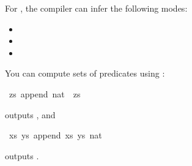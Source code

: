 \begin{isabellebody}
\begin{isamarkuptext}
  For , the compiler can infer the following modes:
  \begin{itemize}
    \item {}
    \item {}
    \item {}
  \end{itemize}
  You can compute sets of predicates using \hypertarget{command.values}{\hyperlink{command.values}{\mbox{}}}:%
\end{isamarkuptext}%
\isamarkuptrue%
%
\isadelimquote
%
\endisadelimquote
%
\isatagquote
{}\isamarkupfalse%
\ {\isachardoublequoteopen}{\isacharbraceleft}zs{\isachardot}\ append\ {\isacharbrackleft}{\isacharparenleft}{}{\isacharcolon}{\isacharcolon}nat{\isacharparenright}{\isacharcomma}{}{\isacharcomma}{}{\isacharbrackright}\ {\isacharbrackleft}{}{\isacharcomma}{}{\isacharbrackright}\ zs{\isacharbraceright}{\isachardoublequoteclose}%
\endisatagquote
{\isafoldquote}%
%
\isadelimquote
%
\endisadelimquote
%
\begin{isamarkuptext}%
\noindent outputs , and%
\end{isamarkuptext}%
\isamarkuptrue%
%
\isadelimquote
%
\endisadelimquote
%
\isatagquote
{}\isamarkupfalse%
\ {\isachardoublequoteopen}{\isacharbraceleft}{\isacharparenleft}xs{\isacharcomma}\ ys{\isacharparenright}{\isachardot}\ append\ xs\ ys\ {\isacharbrackleft}{\isacharparenleft}{}{\isacharcolon}{\isacharcolon}nat{\isacharparenright}{\isacharcomma}{}{\isacharbrackright}{\isacharbraceright}{\isachardoublequoteclose}%
\endisatagquote
{\isafoldquote}%
%
\isadelimquote
%
\endisadelimquote
%
\begin{isamarkuptext}%
\noindent outputs .%

\end{isamarkuptext}
\end{isabellebody}
